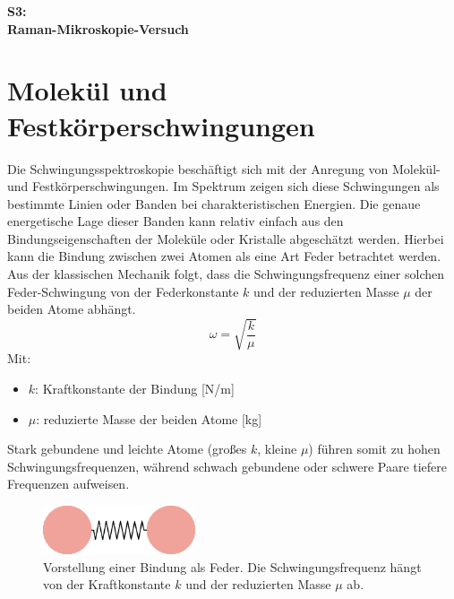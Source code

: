 
\begin{center}
    \begin{huge}
    \textbf{S3:\\}
    \vspace{0.5cm}
    \textbf{Raman-Mikroskopie-Versuch}
    \end{huge}
    \vspace{0.5cm}
\end{center}
\section{Molekül und Festkörperschwingungen}\label{sec:vib}
Die Schwingungsspektroskopie beschäftigt sich mit der Anregung von Molekül- und Festkörperschwingungen. 
Im Spektrum zeigen sich diese Schwingungen als bestimmte Linien oder Banden bei charakteristischen Energien. 
Die genaue energetische Lage dieser Banden kann relativ einfach aus den Bindungseigenschaften der Moleküle oder Kristalle abgeschätzt werden.
Hierbei kann die Bindung zwischen zwei Atomen als eine Art Feder betrachtet werden. Aus der klassischen Mechanik folgt, dass die 
Schwingungsfrequenz einer solchen Feder-Schwingung von der Federkonstante $k$ und der reduzierten Masse $\mu$ der beiden Atome abhängt.
\begin{equation}
    \omega = \sqrt{\frac{k}{\mu}} 
    \label{eq:schwingungsfrequenz}
\end{equation}
Mit:
\begin{itemize}
    \item $k$: Kraftkonstante der Bindung [N/m]
    \item $\mu$: reduzierte Masse der beiden Atome [kg]
\end{itemize}

Stark gebundene und leichte Atome (großes $k$, kleine $\mu$) führen somit zu hohen Schwingungsfrequenzen, während schwach gebundene oder schwere Paare tiefere Frequenzen aufweisen. 

\begin{figure}[H]
    \centering
    \includegraphics[width=0.4\textwidth]{1_Skript/Inkscape/Feder.png}
    \caption{Vorstellung einer Bindung als Feder. Die Schwingungsfrequenz hängt von der Kraftkonstante $k$ und der reduzierten Masse $\mu$ ab.}
    \label{fig:Feder}
\end{figure}

